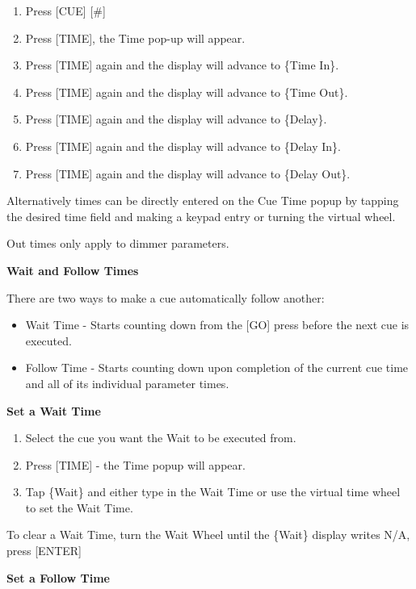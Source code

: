 \documentclass[
]{article}
\begin{document}
\begin{enumerate}
\def\labelenumi{\arabic{enumi}.}
\item
  Press {[}CUE{]} {[}\#{]}
\item
  Press {[}TIME{]}, the Time pop-up will appear.
\item
  Press {[}TIME{]} again and the display will advance to \{Time In\}.
\item
  Press {[}TIME{]} again and the display will advance to \{Time Out\}.
\item
  Press {[}TIME{]} again and the display will advance to \{Delay\}.
\item
  Press {[}TIME{]} again and the display will advance to \{Delay In\}.
\item
  Press {[}TIME{]} again and the display will advance to \{Delay Out\}.
\end{enumerate}

Alternatively times can be directly entered on the Cue Time popup by tapping the desired time field and making a keypad entry or turning the virtual wheel.

{Out times only apply to dimmer parameters.}

\textbf{Wait and Follow Times}

There are two ways to make a cue automatically follow another:

\begin{itemize}
\item
  Wait Time - Starts counting down from the {[}GO{]} press before the next cue is executed.
\item
  Follow Time - Starts counting down upon completion of the current cue time and all of its individual parameter times.
\end{itemize}

\textbf{Set a Wait Time}

\begin{enumerate}
\def\labelenumi{\arabic{enumi}.}
\item
  Select the cue you want the Wait to be executed from.
\item
  Press {[}TIME{]} - the Time popup will appear.
\item
  Tap \{Wait\} and either type in the Wait Time or use the virtual time wheel to set the Wait Time.
\end{enumerate}

To clear a Wait Time, turn the Wait Wheel until the \{Wait\} display writes N/A, press {[}ENTER{]}

\textbf{Set a Follow Time}
\end{document}
